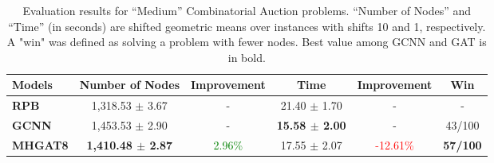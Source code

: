 \begin{table*}[htb!]
    \centering
    \begin{tabular}{|l c c c c c|}
        \hline
        \textbf{Models} & \textbf{Number of Nodes} & \textbf{Improvement} & \textbf{Time} & \textbf{Improvement} & \textbf{Win}\\
        \hline
        \textbf{RPB} & 1,318.53 $\pm$ 3.67 & - & 21.40 $\pm$ 1.70 & - & -\\
        \hline
        \textbf{GCNN} & 1,453.53 $\pm$ 2.90 & - & \textbf{15.58 $\pm$ 2.00} & - & 43/100\\
        \textbf{MHGAT8} & \textbf{1,410.48 $\pm$ 2.87} & \textcolor{green}{2.96\%} & 17.55 $\pm$ 2.07 & \textcolor{red}{-12.61\%} & \textbf{57/100}\\
        \hline
    \end{tabular}
    \caption{Evaluation results for “Medium” Combinatorial Auction problems. “Number of Nodes” and “Time” (in seconds) are shifted geometric means over instances with shifts 10 and 1, respectively.
    A "win" was defined as solving a problem with fewer nodes.
    Best value among GCNN and GAT is in bold.}
    \label{tab:ca-results-medium}
\end{table*}